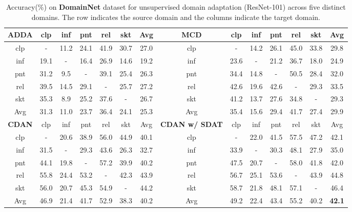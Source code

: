 \documentclass[table,dvipsnames]{article}
\theoremstyle{plain}
\theoremstyle{definition}
\theoremstyle{remark}
\begin{document}
 \begin{table*}[tb]


    \centering
    \caption{Accuracy(\%) on \textbf{DomainNet} dataset for unsupervised domain adaptation (ResNet-101) across five distinct domains. The row indicates the source domain and the columns indicate the target domain.}
\vskip 0.15in
    \footnotesize
    \begin{adjustbox}{max width=\textwidth} 
\begin{tabular}{c|c c c c c c ||c|c c c c c c  }
    \hline
    ADDA & clp & inf & pnt  & rel & skt & Avg & MCD &    clp & inf & pnt  & rel & skt & Avg\\
    \hline
    clp & - & 11.2 & 24.1 & 41.9 & 30.7 & 27.0 & clp & - & 14.2 & 26.1 & 45.0 & 33.8 & 29.8\\
    inf & 19.1 & - & 16.4 & 26.9 & 14.6 & 19.2 & inf & 23.6 & - & 21.2 & 36.7 & 18.0 & 24.9\\
    pnt & 31.2 & 9.5 & - & 39.1 & 25.4 & 26.3  & pnt & 34.4 & 14.8 & - & 50.5 & 28.4 & 32.0\\
    rel & 39.5 & 14.5 & 29.1 & - & 25.7 & 	27.2 & rel & 42.6 & 19.6 & 42.6 & - & 29.3 & 33.5\\
    skt & 35.3 & 8.9 & 25.2 & 37.6 & - & 	26.7 & skt & 41.2 & 13.7 & 27.6 & 34.8 & - & 29.3 \\
    Avg & 31.3 & 11.0 & 23.7 & 36.4 & 24.1 &25.3 & Avg & 35.4 & 	15.6 & 	29.4 & 41.7 & 27.4  & 29.9\\
    \hline
    \textbf{CDAN} &   clp & inf & pnt  & rel & skt & Avg & \textbf{CDAN w/ SDAT}&    clp & inf & pnt  & rel & skt & Avg  \\\hline
    clp &     -  & 20.6& 38.9 &  56.0 & 44.9 & 40.1& clp &     -  & 22.0 & 41.5 &   57.5 & 47.2 & 42.1 \\
    inf &    31.5 &  -  & 29.3   & 43.6 & 26.3 & 32.7  & inf &    33.9 &  -  & 30.3 &  48.1 & 27.9 & 35.0\\
    pnt &    44.1 & 19.8 &   - & 57.2 & 39.9 & 40.2 & pnt &    47.5 & 20.7 &   - &   58.0 & 41.8 & 42.0\\
    rel &    55.8& 24.4 & 53.2  &  -  & 42.3 & 43.9  & rel &    56.7 & 25.1 & 53.6 &  -  & 43.9 & 44.8\\
     skt &    56.0 & 20.7 & 45.3 &   54.9&  -  & 44.2 & skt &    58.7 & 21.8 & 48.1  & 57.1 &  -  & 46.4 \\
     Avg&    46.9 & 21.4 & 41.7    & 52.9 & 38.3 & 40.2 & Avg &   49.2 & 22.4 & 43.4 &  55.2 & 40.2 & \textbf{42.1}\\
     
    
    \hline

    \hline 
\end{tabular}
\end{adjustbox}
    \label{tab:domainnet}

\end{table*}
\end{document}

